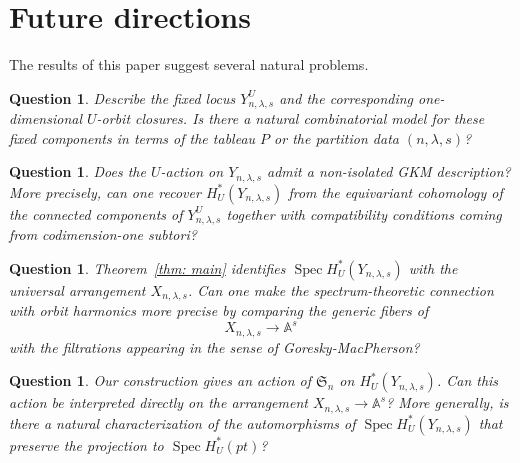 \documentclass[11pt]{amsart}
\numberwithin{equation}{section}
\newtheorem{question}[theorem]{Question}
\theoremstyle{definition}
\newcommand{\symm}{{\mathfrak{S}}}
\DeclareMathOperator{\Spec}{Spec}
\begin{document}
\section{Future directions}

The results of this paper suggest several natural problems.

\begin{question}
Describe the fixed locus $Y_{n,\lambda,s}^U$ and the corresponding
one-dimensional $U$-orbit closures. Is there a natural combinatorial model for
these fixed components in terms of the tableau $P$ or the partition data
$(n,\lambda,s)$?
\end{question}

\begin{question}
Does the $U$-action on $Y_{n,\lambda,s}$ admit a non-isolated GKM description?
More precisely, can one recover $H_U^*(Y_{n,\lambda,s})$ from the equivariant
cohomology of the connected components of $Y_{n,\lambda,s}^U$ together with
compatibility conditions coming from codimension-one subtori?
\end{question}

\begin{question}
Theorem~\ref{thm: main} identifies $\Spec H_U^*(Y_{n,\lambda,s})$ with the
universal arrangement $X_{n,\lambda,s}$. Can one make the spectrum-theoretic
connection with orbit harmonics more precise by comparing the generic fibers of
\[
X_{n,\lambda,s}\to \mathbb A^s
\]
with the filtrations appearing in the sense of Goresky-MacPherson?
\end{question}

\begin{question}
Our construction gives an action of $\symm_n$ on $H_U^*(Y_{n,\lambda,s})$.
Can this action be interpreted directly on the arrangement
$X_{n,\lambda,s}\to \mathbb A^s$? More generally, is there a natural
characterization of the automorphisms of $\Spec H_U^*(Y_{n,\lambda,s})$ that
preserve the projection to $\Spec H_U^*(pt)$?
\end{question}



\end{document}
